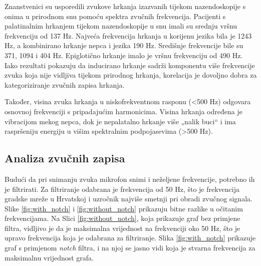 Znanstvenici \cite{bib} su usporedili zvukove hrkanja izazvanih tijekom nazendoskopije s onima u prirodnom snu pomoću spektra zvučnih frekvencija. Pacijenti s palatinalnim hrkanjem tijekom nazendoskopije u snu imali su srednju vršnu frekvenciju od 137 Hz. Najveća frekvencija hrkanja u korijenu jezika bila je 1243 Hz, a kombinirano hrkanje nepca i jezika 190 Hz. Središnje frekvencije bile su 371, 1094 i 404 Hz. Epiglotično hrkanje imalo je vršnu frekvenciju od 490 Hz. Iako rezultati pokazuju da inducirano hrkanje sadrži komponentu više frekvencije zvuka koja nije vidljiva tijekom prirodnog hrkanja, korelacija je dovoljno dobra za kategoriziranje zvučnih zapisa hrkanja. 

Također, visina zvuka hrkanja u niskofrekventnom rasponu (<500 Hz) odgovara osnovnoj frekvenciji s pripadajućim harmonicima. Visina hrkanja određena je vibracijom mekog nepca, dok je nepalatalno hrkanje više „nalik buci“ i ima raspršeniju energiju u višim spektralnim podpojasevima (>500 Hz).

\subsection{Analiza zvučnih zapisa}

Budući da pri snimanju zvuka mikrofon snimi i neželjene frekvencije, potrebno ih je filtrirati. Za filtriranje odabrana je frekvencija od 50 Hz, što je frekvencija gradske mreže u Hrvatskoj i uzročnik najviše smetnji pri obradi zvučnog signala. Slike \ref{fig:with_notch} i \ref{fig:without_notch} prikazuju bitne razlike u očitanim frekvencijama. Na Slici \ref{fig:without_notch}, koja prikazuje graf bez primjene filtra, vidljivo je da je maksimalna vrijednost na frekvenciji oko 50 Hz, što je upravo frekvencija koja je odabrana za filtriranje. Slika \ref{fig:with_notch} prikazuje graf s primjenom \textit{notch} filtra, i na njoj se jasno vidi koja je stvarna frekvencija za maksimalnu vrijednost grafa. 


